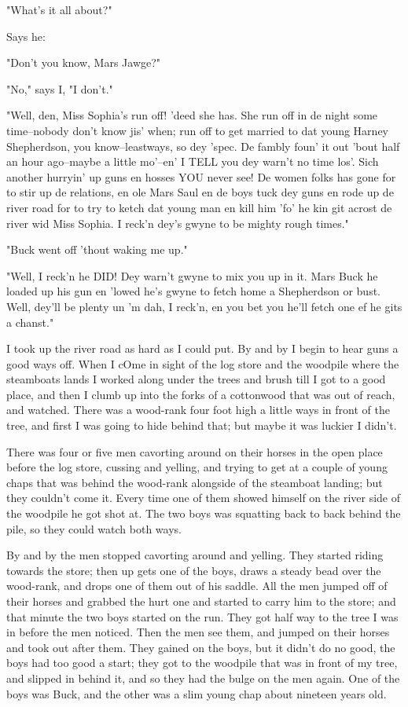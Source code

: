 "What's it all about?"

Says he:

"Don't you know, Mars Jawge?"

"No," says I, "I don't."

"Well, den, Miss Sophia's run off! 'deed she has.  She run off in de
night some time--nobody don't know jis' when; run off to get married to
dat young Harney Shepherdson, you know--leastways, so dey 'spec.  De
fambly foun' it out 'bout half an hour ago--maybe a little mo'--en' I
TELL you dey warn't no time los'.  Sich another hurryin' up guns en
hosses YOU never see!  De women folks has gone for to stir up de
relations, en ole Mars Saul en de boys tuck dey guns en rode up de river
road for to try to ketch dat young man en kill him 'fo' he kin git acrost
de river wid Miss Sophia.  I reck'n dey's gwyne to be mighty rough
times."

"Buck went off 'thout waking me up."

"Well, I reck'n he DID!  Dey warn't gwyne to mix you up in it.  Mars Buck
he loaded up his gun en 'lowed he's gwyne to fetch home a Shepherdson or
bust. Well, dey'll be plenty un 'm dah, I reck'n, en you bet you he'll
fetch one ef he gits a chanst."

I took up the river road as hard as I could put.  By and by I begin to
hear guns a good ways off.  When I cOme in sight of the log store and the
woodpile where the steamboats lands I worked along under the trees and
brush till I got to a good place, and then I clumb up into the forks of a
cottonwood that was out of reach, and watched.  There was a wood-rank
four foot high a little ways in front of the tree, and first I was going
to hide behind that; but maybe it was luckier I didn't.

There was four or five men cavorting around on their horses in the open
place before the log store, cussing and yelling, and trying to get at a
couple of young chaps that was behind the wood-rank alongside of the
steamboat landing; but they couldn't come it.  Every time one of them
showed himself on the river side of the woodpile he got shot at.  The two
boys was squatting back to back behind the pile, so they could watch both
ways.

By and by the men stopped cavorting around and yelling.  They started
riding towards the store; then up gets one of the boys, draws a steady
bead over the wood-rank, and drops one of them out of his saddle.  All
the men jumped off of their horses and grabbed the hurt one and started
to carry him to the store; and that minute the two boys started on the
run.  They got half way to the tree I was in before the men noticed.
Then the men see them, and jumped on their horses and took out after
them.  They gained on the boys, but it didn't do no good, the boys had
too good a start; they got to the woodpile that was in front of my tree,
and slipped in behind it, and so they had the bulge on the men again.
One of the boys was Buck, and the other was a slim young chap about
nineteen years old.

